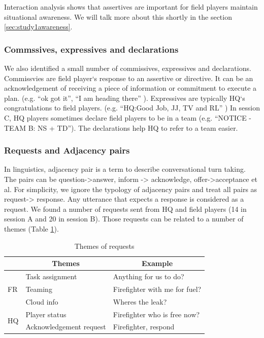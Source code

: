Interaction analysis shows that assertives are important for field players maintain situational awareness. We will talk more about this shortly in the section \ref{sec:study1awareness}.\\

\subsubsection{Commssives, expressives and declarations}
We also identified a small number of commissives, expressives and declarations. Commissvies are field player`s response to an assertive or directive. It can be an acknowledgement of receiving a piece of information or commitment to execute a plan. (e.g. ``ok got it'', ``I am heading there'' ). Expressives are typically HQ`s congratulations to field players. (e.g. ``HQ:Good Job, JJ, TV and RL'' ) In session C, HQ players sometimes declare field players to be in a team (e.g. ``NOTICE - TEAM B: NS + TD''). The declarations help HQ to refer to a team easier.\\

\subsubsection{Requests and Adjacency pairs}\label{sec:adjpairs}
In linguistics, adjacency pair is a term to describe conversational turn taking. The pairs can be question->answer, inform -> acknowledge, offer->acceptance et al. For simplicity, we ignore the typology of adjacency pairs and treat all pairs as request-> response. Any utterance that expects a response is considered as a request. We found a number of requests sent from HQ and field players (14 in session A and 20 in session B). Those requests can be related to a number of themes (Table \ref{tab:requestThemes}).\\

\begin{table}[h]
\footnotesize
\begin{tabular}{l|ll}
                    & \multicolumn{1}{c}{Themes} & \multicolumn{1}{c}{Example}   \\ \hline
\multirow{3}{*}{FR} & Task assignment            & Anything for us to do?        \\
                    & Teaming                    & Firefighter with me for fuel? \\
                    & Cloud info                 & Wheres the leak?              \\ \hline
\multirow{2}{*}{HQ} & Player status              & Firefighter who is free now?  \\
                    & Acknowledgement request    & Firefighter, respond         
\end{tabular}
\caption{Themes of requests}
\label{tab:requestThemes}
\end{table}

